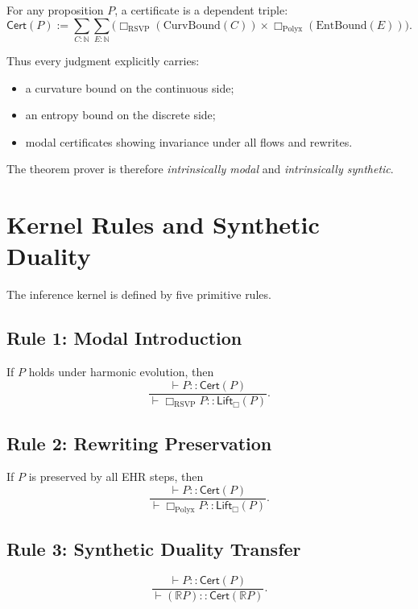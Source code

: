 \begin{definition}
For any proposition $P$, a certificate is a dependent triple:
\[
\mathsf{Cert}(P)
  := \sum_{C:\mathbb{N}}
        \sum_{E:\mathbb{N}}
        \bigl(
           \Box_{\mathrm{RSVP}}(\mathrm{CurvBound}(C))
           \times
           \Box_{\mathrm{Polyx}}(\mathrm{EntBound}(E))
        \bigr).
\]
\end{definition}

Thus every judgment explicitly carries:

\begin{itemize}
\item a curvature bound on the continuous side;
\item an entropy bound on the discrete side;
\item modal certificates showing invariance under all flows and rewrites.
\end{itemize}

The theorem prover is therefore \emph{intrinsically modal} and
\emph{intrinsically synthetic}.


\section{Kernel Rules and Synthetic Duality}
\label{sec:kernel}

The inference kernel is defined by five primitive rules.

\subsection*{Rule 1: Modal Introduction}
If $P$ holds under harmonic evolution, then
\[
\frac{
  \vdash P :: \mathsf{Cert}(P)
}{
  \vdash \Box_{\mathrm{RSVP}} P :: \mathsf{Lift}_{\Box}(P)
}.
\]

\subsection*{Rule 2: Rewriting Preservation}
If $P$ is preserved by all EHR steps, then
\[
\frac{
  \vdash P :: \mathsf{Cert}(P)
}{
  \vdash \Box_{\mathrm{Polyx}} P :: \mathsf{Lift}_{\Box}(P)
}.
\]

\subsection*{Rule 3: Synthetic Duality Transfer}
\[
\frac{
  \vdash P :: \mathsf{Cert}(P)
}{
  \vdash (\mathbb{R}P) :: \mathsf{Cert}(\mathbb{R}P)
}.
\]

